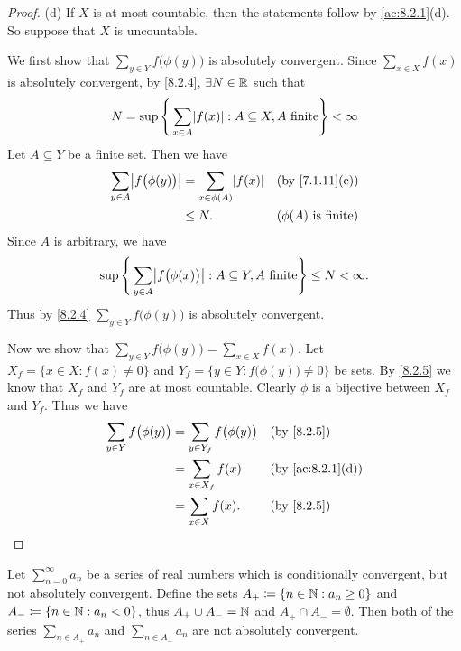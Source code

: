 \begin{proof}{(d)}
  If \(X\) is at most countable, then the statements follow by \cref{ac:8.2.1}(d).
  So suppose that \(X\) is uncountable.

  We first show that \(\sum_{y \in Y} f\big(\phi(y)\big)\) is absolutely convergent.
  Since \(\sum_{x \in X} f(x)\) is absolutely convergent, by \cref{8.2.4}, \(\exists N \in \mathbb{R}\) such that
  \[
    N = \sup\Bigg\{\sum_{x \in A} \abs{f(x)} : A \subseteq X, A \text{ finite}\Bigg\} < \infty
  \]
  Let \(A \subseteq Y\) be a finite set.
  Then we have
  \begin{align*}
    \sum_{y \in A} \abs{f\big(\phi(y)\big)} & = \sum_{x \in \phi(A)} \abs{f(x)} &  & \text{(by \cref{7.1.11}(c))}   \\
                                            & \leq N.                           &  & \text{(\(\phi(A)\) is finite)}
  \end{align*}
  Since \(A\) is arbitrary, we have
  \[
    \sup\Bigg\{\sum_{y \in A} \abs{f\big(\phi(x)\big)} : A \subseteq Y, A \text{ finite}\Bigg\} \leq N < \infty.
  \]
  Thus by \cref{8.2.4} \(\sum_{y \in Y} f\big(\phi(y)\big)\) is absolutely convergent.

  Now we show that \(\sum_{y \in Y} f\big(\phi(y)\big) = \sum_{x \in X} f(x)\).
  Let \(X_f = \{x \in X : f(x) \neq 0\}\) and \(Y_f = \{y \in Y : f\big(\phi(y)\big) \neq 0\}\) be sets.
  By \cref{8.2.5} we know that \(X_f\) and \(Y_f\) are at most countable.
  Clearly \(\phi\) is a bijective between \(X_f\) and \(Y_f\).
  Thus we have
  \begin{align*}
    \sum_{y \in Y} f\big(\phi(y)\big) & = \sum_{y \in Y_f} f\big(\phi(y)\big) &  & \by{8.2.5}                     \\
                                      & = \sum_{x \in X_f} f(x)               &  & \text{(by \cref{ac:8.2.1}(d))} \\
                                      & = \sum_{x \in X} f(x).                &  & \by{8.2.5}
  \end{align*}
\end{proof}

\begin{lem}\label{8.2.7}
  Let \(\sum_{n = 0}^\infty a_n\) be a series of real numbers which is conditionally convergent, but not absolutely convergent.
  Define the sets \(A_+ \coloneqq \{n \in \mathbb{N} : a_n \geq 0\}\) and \(A_- \coloneqq \{n \in \mathbb{N} : a_n < 0\}\), thus \(A_+ \cup A_- = \mathbb{N}\) and \(A_+ \cap A_- = \emptyset\).
  Then both of the series \(\sum_{n \in A_+} a_n\) and \(\sum_{n \in A_-} a_n\) are not absolutely convergent.
\end{lem}

